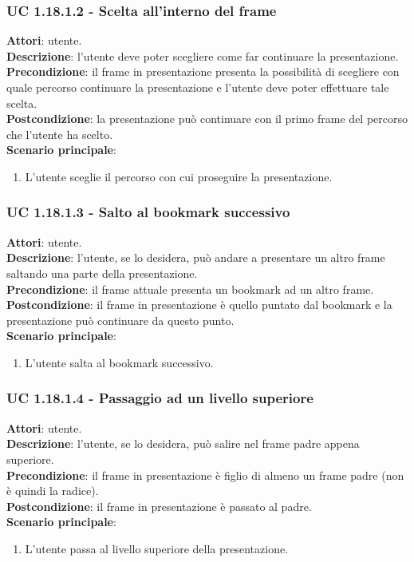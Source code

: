 	\subsubsection{UC 1.18.1.2 - Scelta all'interno del frame}{
		\label{uc1.18.1.2}
		\textbf{Attori}: utente. \\
		\textbf{Descrizione}: l'utente deve poter scegliere come far continuare la presentazione. \\
		\textbf{Precondizione}: il frame in presentazione presenta la possibilità di scegliere con quale percorso continuare la presentazione e l'utente deve poter effettuare tale scelta.	\\
		\textbf{Postcondizione}: la presentazione può continuare con il primo frame del percorso che l'utente ha scelto.\\
		\textbf{Scenario principale}:
		\begin{enumerate}
			\item L'utente sceglie il percorso con cui proseguire la presentazione.
		\end{enumerate}
	}
	\subsubsection{UC 1.18.1.3 - Salto al bookmark successivo}{
		\label{uc1.18.1.3}
		\textbf{Attori}: utente. \\
		\textbf{Descrizione}: l'utente, se lo desidera, può andare a presentare un altro frame saltando una parte della presentazione. \\
		\textbf{Precondizione}: il frame attuale presenta un bookmark ad un altro frame.	\\
		\textbf{Postcondizione}: il frame in presentazione è quello puntato dal bookmark e la presentazione può continuare da questo punto.	\\
		\textbf{Scenario principale}:
		\begin{enumerate}
			\item L'utente salta al bookmark successivo.
		\end{enumerate}
	}
	\subsubsection{UC 1.18.1.4 - Passaggio ad un livello superiore}{
		\label{uc1.18.1.4}
		\textbf{Attori}: utente. \\
		\textbf{Descrizione}: l'utente, se lo desidera, può salire nel frame padre appena superiore. \\
		\textbf{Precondizione}: il frame in presentazione è figlio di almeno un frame padre (non è quindi la radice).	\\
		\textbf{Postcondizione}: il frame in presentazione è passato al padre.\\
		\textbf{Scenario principale}:
		\begin{enumerate}
			\item L'utente passa al livello superiore della presentazione.
		\end{enumerate}
	}
